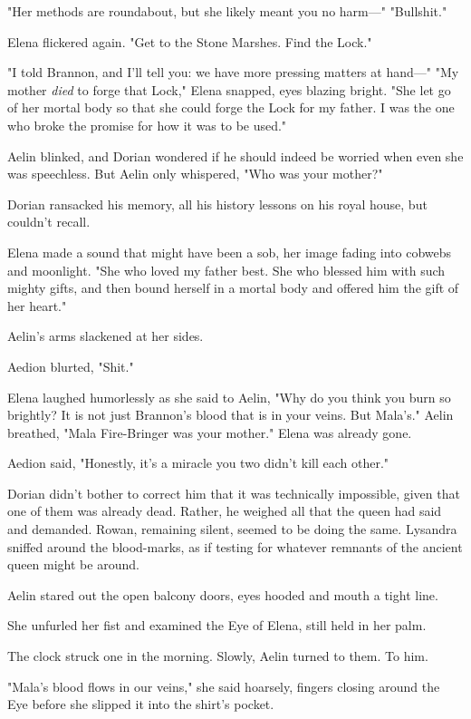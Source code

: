 "Her methods are roundabout, but she likely meant you no harm---" "Bullshit."

Elena flickered again. "Get to the Stone Marshes. Find the Lock."

"I told Brannon, and I'll tell you: we have more pressing matters at hand---" "My mother \emph{died} to forge that Lock," Elena snapped, eyes blazing bright. "She let go of her mortal body so that she could forge the Lock for my father. I was the one who broke the promise for how it was to be used."

Aelin blinked, and Dorian wondered if he should indeed be worried when even she was speechless. But Aelin only whispered, "Who was your mother?"

Dorian ransacked his memory, all his history lessons on his royal house, but couldn't recall.

Elena made a sound that might have been a sob, her image fading into cobwebs and moonlight. "She who loved my father best. She who blessed him with such mighty gifts, and then bound herself in a mortal body and offered him the gift of her heart."

Aelin's arms slackened at her sides.

Aedion blurted, "Shit."

Elena laughed humorlessly as she said to Aelin, "Why do you think you burn so brightly? It is not just Brannon's blood that is in your veins. But Mala's." Aelin breathed, "Mala Fire-Bringer was your mother." Elena was already gone.

Aedion said, "Honestly, it's a miracle you two didn't kill each other."

Dorian didn't bother to correct him that it was technically impossible, given that one of them was already dead. Rather, he weighed all that the queen had said and demanded. Rowan, remaining silent, seemed to be doing the same. Lysandra sniffed around the blood-marks, as if testing for whatever remnants of the ancient queen might be around.

Aelin stared out the open balcony doors, eyes hooded and mouth a tight line.

She unfurled her fist and examined the Eye of Elena, still held in her palm.

The clock struck one in the morning. Slowly, Aelin turned to them. To him.

"Mala's blood flows in our veins," she said hoarsely, fingers closing around the Eye before she slipped it into the shirt's pocket.

